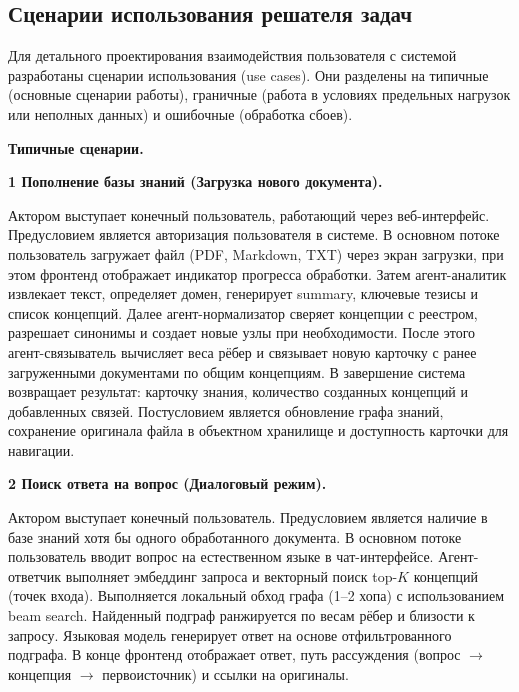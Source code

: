 \subsection{Сценарии использования решателя задач}


Для детального проектирования взаимодействия пользователя с системой разработаны сценарии использования (use cases). Они разделены на типичные (основные сценарии работы), граничные (работа в условиях предельных нагрузок или неполных данных) и ошибочные (обработка сбоев).

\textbf{Типичные сценарии.}

\vspace{0.5em}
\textbf{1 Пополнение базы знаний (Загрузка нового документа).}

Актором выступает конечный пользователь, работающий через веб-интерфейс. Предусловием является авторизация пользователя в системе. В основном потоке пользователь загружает файл (PDF, Markdown, TXT) через экран загрузки, при этом фронтенд отображает индикатор прогресса обработки. Затем агент-аналитик извлекает текст, определяет домен, генерирует summary, ключевые тезисы и список концепций. Далее агент-нормализатор сверяет концепции с реестром, разрешает синонимы и создает новые узлы при необходимости. После этого агент-связыватель вычисляет веса рёбер и связывает новую карточку с ранее загруженными документами по общим концепциям. В завершение система возвращает результат: карточку знания, количество созданных концепций и добавленных связей. Постусловием является обновление графа знаний, сохранение оригинала файла в объектном хранилище и доступность карточки для навигации.

\vspace{0.5em}
\textbf{2 Поиск ответа на вопрос (Диалоговый режим).}

Актором выступает конечный пользователь. Предусловием является наличие в базе знаний хотя бы одного обработанного документа. В основном потоке пользователь вводит вопрос на естественном языке в чат-интерфейсе. Агент-ответчик выполняет эмбеддинг запроса и векторный поиск top-$K$ концепций (точек входа). Выполняется локальный обход графа (1--2 хопа) с использованием beam search. Найденный подграф ранжируется по весам рёбер и близости к запросу. Языковая модель генерирует ответ на основе отфильтрованного подграфа. В конце фронтенд отображает ответ, путь рассуждения (вопрос $\rightarrow$ концепция $\rightarrow$ первоисточник) и ссылки на оригиналы.

